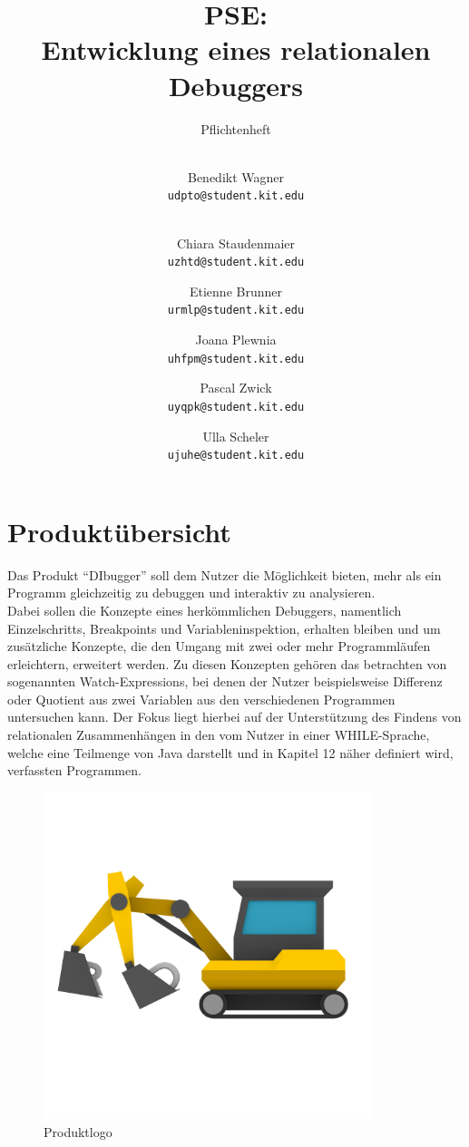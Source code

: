 \documentclass[parskip=full]{scrartcl}
\title{
	\vspace{2cm}
	PSE:\\ 
	Entwicklung eines relationalen Debuggers\\
}
\subtitle{
	\vspace{1cm}Pflichtenheft
}
\author{
	\vspace{1cm} \\
	Benedikt Wagner\\
	\texttt{udpto@student.kit.edu}
	\and \vspace{1cm} \\ Chiara Staudenmaier\\
	\texttt{uzhtd@student.kit.edu}
	\and Etienne Brunner\\
	\texttt{urmlp@student.kit.edu}
	\and Joana Plewnia\\
	\texttt{uhfpm@student.kit.edu} 
	\and Pascal Zwick\\
	\texttt{uyqpk@student.kit.edu}
	\and Ulla Scheler\\
	\texttt{ujuhe@student.kit.edu}
}
\begin{document}
\maketitle
\newpage

\tableofcontents
\newpage


\section{Produktübersicht}
Das Produkt \enquote{DIbugger} soll dem Nutzer die Möglichkeit bieten, mehr als ein Programm gleichzeitig zu debuggen und interaktiv zu analysieren. \\
Dabei sollen die Konzepte eines herkömmlichen Debuggers, namentlich \glspl{Einzelschritt}, \glspl{Breakpoint} und Variableninspektion, erhalten bleiben und um zusätzliche Konzepte, die den Umgang mit zwei oder mehr Programmläufen erleichtern, erweitert werden. Zu diesen Konzepten gehören das betrachten von sogenannten \glspl{Watch-Expression}, bei denen der Nutzer beispielsweise Differenz oder Quotient aus zwei Variablen aus den verschiedenen Programmen untersuchen kann. Der Fokus liegt hierbei auf der Unterstützung des Findens von relationalen Zusammenhängen in den vom Nutzer in einer WHILE-Sprache, welche eine Teilmenge von Java darstellt und in Kapitel 12 näher definiert wird, verfassten Programmen.
\begin{figure}[!h]
\centering
\includegraphics[width=0.85\textwidth]{logo_nongi.png}
\caption{Produktlogo}
\end{figure}
\end{document}
